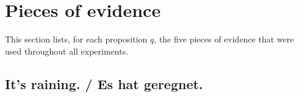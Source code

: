 \documentclass[11pt]{article}
\begin{document}

%
%
%

\appendix

\section{Pieces of evidence}
\label{sec:evidence}

This section lists, for each proposition $q$, the five pieces of evidence that were used throughout all experiments.

\subsection{It's raining. / Es hat geregnet.}
\end{document}
